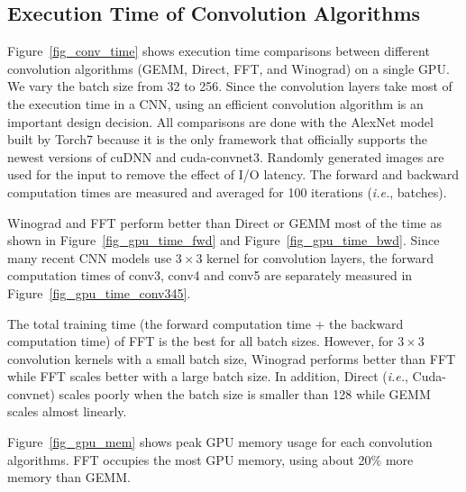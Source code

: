 \subsection{Execution Time of Convolution Algorithms}
Figure~\ref{fig_conv_time} shows execution time comparisons between different convolution algorithms (\textsf{GEMM}, \textsf{Direct}, \textsf{FFT}, and \textsf{Winograd}) on a single GPU. We vary the batch size from 32 to 256. Since the convolution layers take most of the execution time in a CNN, using an efficient convolution algorithm is an important design decision. All comparisons are done with the AlexNet model built by Torch7 because it is the only framework that officially supports the newest versions of cuDNN and cuda-convnet3. Randomly generated images are used for the input to remove the effect of I/O latency. The forward and backward computation times are measured and averaged for 100 iterations (\textit{i.e.}, batches). 

\textsf{Winograd} and \textsf{FFT} perform better than \textsf{Direct} or \textsf{GEMM} most of the time as shown in Figure~\ref{fig_gpu_time_fwd} and Figure~\ref{fig_gpu_time_bwd}. Since many recent CNN models use $3 \times 3$ kernel for convolution layers\cite{vgg}, the forward computation times of \textsf{conv3},  \textsf{conv4} and \textsf{conv5} are separately measured in Figure~\ref{fig_gpu_time_conv345}.

The total training time (the forward computation time + the backward computation time) of \textsf{FFT} is the best for all batch sizes. However, for $3 \times 3$ convolution kernels with a small batch size, \textsf{Winograd} performs better than \textsf{FFT} while \textsf{FFT} scales better with a large batch size. In addition, \textsf{Direct} (\textit{i.e.}, Cuda-convnet) scales poorly when the batch size is smaller than 128 while \textsf{GEMM} scales almost linearly.

Figure~\ref{fig_gpu_mem} shows peak GPU memory usage for each convolution algorithms. \textsf{FFT} occupies the most GPU memory, using about 20\% more memory than \textsf{GEMM}. 

